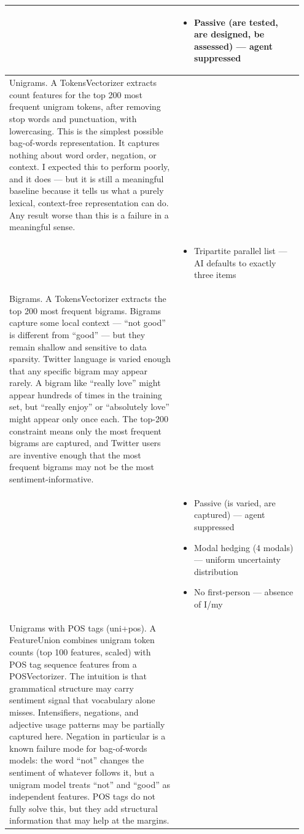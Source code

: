 \documentclass[11pt]{article}
\begin{document}
\begin{longtable}{|p{0.55\linewidth}|p{0.40\linewidth}|}
\rule[-3.5cm]{0pt}{3.5cm} & \begin{itemize}[leftmargin=1em,itemsep=1pt,topsep=1pt,parsep=0pt]
  \item Passive (are tested, are designed, be assessed) --- agent suppressed
\end{itemize} \\
\hline
Unigrams. A TokensVectorizer extracts count features for the top 200 most frequent unigram tokens, after removing stop words and punctuation, with lowercasing. This is the simplest possible bag-of-words representation. It captures nothing about word order, negation, or context. I expected this to perform poorly, and it does --- but it is still a meaningful baseline because it tells us what a purely lexical, context-free representation can do. Any result worse than this is a failure in a meaningful sense. & \\[2pt]
\hline
\rule[-3.5cm]{0pt}{3.5cm} & \begin{itemize}[leftmargin=1em,itemsep=1pt,topsep=1pt,parsep=0pt]
  \item Tripartite parallel list --- AI defaults to exactly three items
\end{itemize} \\
\hline
Bigrams. A TokensVectorizer extracts the top 200 most frequent bigrams. Bigrams capture some local context --- ``not good'' is different from ``good'' --- but they remain shallow and sensitive to data sparsity. Twitter language is varied enough that any specific bigram may appear rarely. A bigram like ``really love'' might appear hundreds of times in the training set, but ``really enjoy'' or ``absolutely love'' might appear only once each. The top-200 constraint means only the most frequent bigrams are captured, and Twitter users are inventive enough that the most frequent bigrams may not be the most sentiment-informative. & \\[2pt]
\hline
\rule[-3.5cm]{0pt}{3.5cm} & \begin{itemize}[leftmargin=1em,itemsep=1pt,topsep=1pt,parsep=0pt]
  \item Passive (is varied, are captured) --- agent suppressed
  \item Modal hedging (4 modals) --- uniform uncertainty distribution
  \item No first-person --- absence of I/my
\end{itemize} \\
\hline
Unigrams with POS tags (uni+pos). A FeatureUnion combines unigram token counts (top 100 features, scaled) with POS tag sequence features from a POSVectorizer. The intuition is that grammatical structure may carry sentiment signal that vocabulary alone misses. Intensifiers, negations, and adjective usage patterns may be partially captured here. Negation in particular is a known failure mode for bag-of-words models: the word ``not'' changes the sentiment of whatever follows it, but a unigram model treats ``not'' and ``good'' as independent features. POS tags do not fully solve this, but they add structural information that may help at the margins. & \\[2pt]

\end{longtable}
\end{document}
